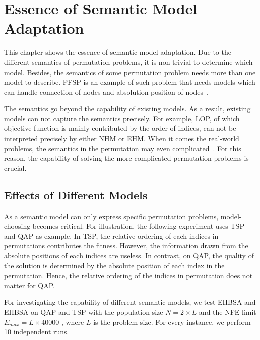 
\section{Essence of Semantic Model Adaptation}
\label{ch:essence_of_adaptation}




This chapter shows the essence of semantic model adaptation. Due to the different semantics of permutation problems, it is non-trivial to determine which model. Besides, the semantics of some permutation problem needs more than one model to describe. PFSP is an example of such problem that needs models which can handle connection of nodes and absolution position of nodes~\citep{tsutsui2006node}. 

The semantics go beyond the capability of existing models. As a result, existing models can not capture the semantics precisely. For example, LOP, of which objective function is mainly contributed by the order of indices, can not be interpreted precisely by either NHM or EHM. When it comes the real-world problems, the semantics in the permutation may even complicated~\citep{ceberio2012review}. For this reason, the capability of solving the more complicated permutation problems is crucial.

\subsection{Effects of Different Models}
As a semantic model can only express specific permutation problems, model-choosing becomes critical. For illustration, the following experiment uses TSP and QAP as example. In TSP, the relative ordering of each indices in permutations contributes the fitness. However, the information drawn from the absolute positions of each indices are useless. In contrast, on QAP, the quality of the solution is determined by the absolute position of each index in the permutation. Hence, the relative ordering of the indices in permutation does not matter for QAP.


  For investigating the capability of different semantic models, we test EHBSA and EHBSA on QAP and TSP with the population size $N = 2 \times L$ and the NFE limit $E_{max} = L \times 40000$ , where $L$ is the problem size. For every instance, we perform 10 independent runs.


